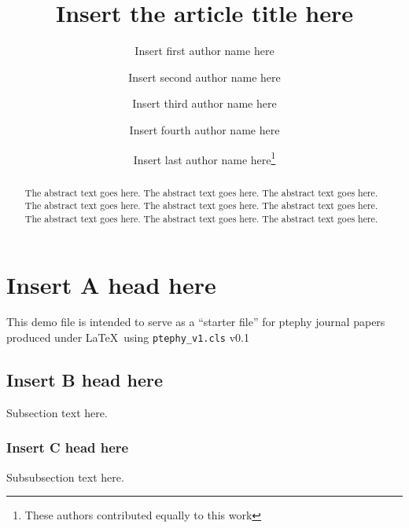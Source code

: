 \documentclass[preprint]{ptephy_v1}%
\begin{document}
\title{Insert the article title here}


\author{Insert first author name here}

\author{Insert second author name here}

\author{Insert third author name here}
\author[3]{Insert fourth author name here} %

\author{Insert last author name here\thanks{These authors contributed equally to this work}}


\begin{abstract}%
The abstract text goes here. The abstract text goes here. The abstract text goes here.
The abstract text goes here. The abstract text goes here. The abstract text goes here.
The abstract text goes here. The abstract text goes here. The abstract text goes here.
\end{abstract}


\maketitle


\section{Insert A head here}
This demo file is intended to serve as a ``starter file''
for ptephy journal papers produced under \LaTeX\ using
\verb+ptephy_v1.cls+ v0.1

\subsection{Insert B head here}
Subsection text here.

\subsubsection{Insert C head here}
Subsubsection text here.
\end{document}
